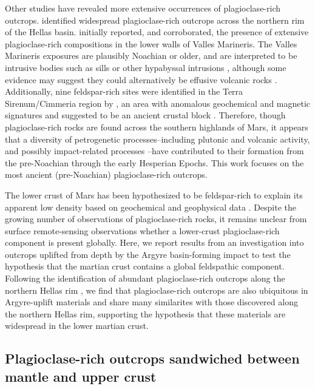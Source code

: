 \documentclass[12pt]{article}
\begin{document}
Other studies have revealed more extensive occurrences of plagioclase-rich outcrops. \citet{Phillips2022} identified widespread plagioclase-rich outcrops across the northern rim of the Hellas basin. \citet{Viviano-Beck2017} initially reported, and \citet{Flahaut2023} corroborated, the presence of extensive plagioclase-rich compositions in the lower walls of Valles Marineris. The Valles Marineris exposures are plausibly Noachian or older, and are interpreted to be intrusive bodies such as sills or other hypabyssal intrusions \citep{Viviano-Beck2017}, although some evidence may suggest they could alternatively be effusive volcanic rocks \citep{Flahaut2023}. Additionally, nine feldspar-rich sites were identified in the Terra Sirenum/Cimmeria region by \citet{Payre2022}, an area with anomalous geochemical and magnetic signatures and suggested to be an ancient crustal block \citep{Bouley2020}. Therefore, though plagioclase-rich rocks are found across the southern highlands of Mars, it appears that a diversity of petrogenetic processes--including plutonic and volcanic activity, and possibly impact-related processes \citep{Grieve1991, Hurwitz2014, Vaughan2014, Koeppel2020}--have contributed to their formation from the pre-Noachian through the early Hesperian Epochs. This work focuses on the most ancient (pre-Noachian) plagioclase-rich outcrops.

The lower crust of Mars has been hypothesized to be feldspar-rich to explain its apparent low density based on geochemical and geophysical data \citep{Baratoux2014, Goossens2017, Knapmeyer-Endrun2021}. Despite the growing number of observations of plagioclase-rich rocks, it remains unclear from surface remote-sensing observations whether a lower-crust plagioclase-rich component is present globally. Here, we report results from an investigation into outcrops uplifted from depth by the Argyre basin-forming impact to test the hypothesis that the martian crust contains a global feldspathic component. Following the identification of abundant plagioclase-rich outcrops along the northern Hellas rim \citep{Phillips2022}, we find that plagioclase-rich outcrops are also ubiquitous in Argyre-uplift materials and share many similarites with those discovered along the northern Hellas rim, supporting the hypothesis that these materials are widespread in the lower martian crust.

\subsection*{Plagioclase-rich outcrops sandwiched between mantle and upper crust}
\end{document}

